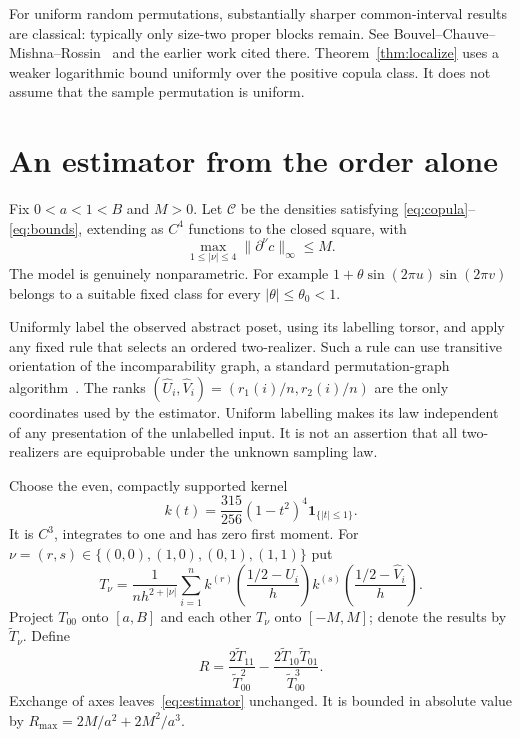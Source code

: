 \documentclass[11pt]{article}
\theoremstyle{remark}
\newcommand{\calC}{\mathcal C}
\numberwithin{equation}{section}
\begin{document}
For uniform random permutations, substantially sharper common-interval
results are classical: typically only size-two proper blocks remain.
See Bouvel--Chauve--Mishna--Rossin~\cite[Theorem 3]{BCMR}
and the earlier work cited there.
Theorem~\ref{thm:localize} uses a weaker logarithmic bound uniformly
over the positive copula class. It does not assume that the
sample permutation is uniform.

\section{An estimator from the order alone}
Fix $0<a<1<B$ and $M>0$. Let $\calC$ be the densities satisfying
\eqref{eq:copula}--\eqref{eq:bounds}, extending as $C^4$ functions
to the closed square, with
\[
 \max_{1\le|\nu|\le4}\|\partial^\nu c\|_\infty\le M.
\]
The model is genuinely nonparametric.
For example $1+\theta\sin(2\pi u)\sin(2\pi v)$ belongs to a suitable
fixed class for every $|\theta|\le\theta_0<1$.

Uniformly label the observed abstract poset, using its labelling torsor,
and apply any fixed rule that selects an ordered two-realizer.
Such a rule can use transitive orientation of the incomparability
graph, a standard permutation-graph algorithm~\cite{CP}.
The ranks $(\widehat U_i,\widehat V_i)=(r_1(i)/n,r_2(i)/n)$ are the
only coordinates used by the estimator.
Uniform labelling makes its law independent of any presentation
of the unlabelled input. It is not an assertion that all two-realizers
are equiprobable under the unknown sampling law.

Choose the even, compactly supported kernel
\[
 k(t)=\frac{315}{256}(1-t^2)^4\mathbf1_{\{|t|\le1\}} .
\]
It is $C^3$, integrates to one and has zero first moment.
For $\nu=(r,s)\in\{(0,0),(1,0),(0,1),(1,1)\}$ put
\begin{equation}\label{eq:kernel}
 T_\nu=\frac1{nh^{2+|\nu|}}
       \sum_{i=1}^n
       k^{(r)}\left(\frac{1/2-\widehat U_i}{h}\right)
       k^{(s)}\left(\frac{1/2-\widehat V_i}{h}\right).
\end{equation}
Project $T_{00}$ onto $[a,B]$ and each other $T_\nu$ onto $[-M,M]$;
denote the results by $\widetilde T_\nu$.
Define
\begin{equation}\label{eq:estimator}
 \widehat R=\frac{2\widetilde T_{11}}{\widetilde T_{00}^2}
       -\frac{2\widetilde T_{10}\widetilde T_{01}}
                         {\widetilde T_{00}^3}.
\end{equation}
Exchange of axes leaves~\eqref{eq:estimator} unchanged.
It is bounded in absolute value by
$R_{\max}=2M/a^2+2M^2/a^3$.
\end{document}
